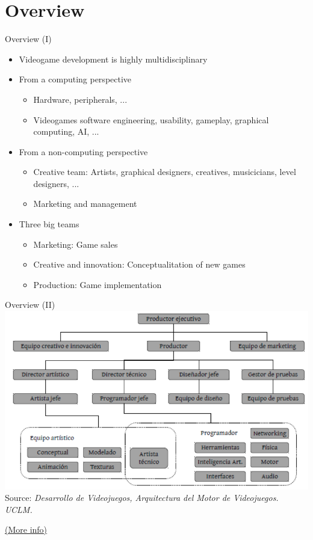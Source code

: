 \documentclass[10pt,compress]{beamer} %
\begin{document}
\section{Overview}
\begin{frame}{Overview (I)}
	\begin{itemize}
	\item Videogame development is highly multidisciplinary
	\item From a computing perspective
		\begin{itemize}
		\item Hardware, peripherals, ...
		\item Videogames software engineering, usability, gameplay, graphical computing, AI, ...
		\end{itemize}
	\item From a non-computing perspective
		\begin{itemize}
		\item Creative team: Artists, graphical designers, creatives, musicicians, level designers, ...
		\item Marketing and management
		\end{itemize}
	\item Three big teams
		\begin{itemize}
		\item Marketing: Game sales
		\item Creative and innovation: Conceptualitation of new games
		\item Production: Game implementation
		\end{itemize}
	\end{itemize}
\end{frame}

\begin{frame}{Overview (II)}
	\centering\includegraphics[width=0.9\linewidth]{figs/equipo}\\
	\tiny{Source: \textit{Desarrollo de Videojuegos, Arquitectura del Motor de Videojuegos. UCLM.}}\\
	\begin{center}
	\href{http://en.wikipedia.org/wiki/Video\_game\_development}{(More info)}
	\end{center}
\end{frame}
\end{document}
